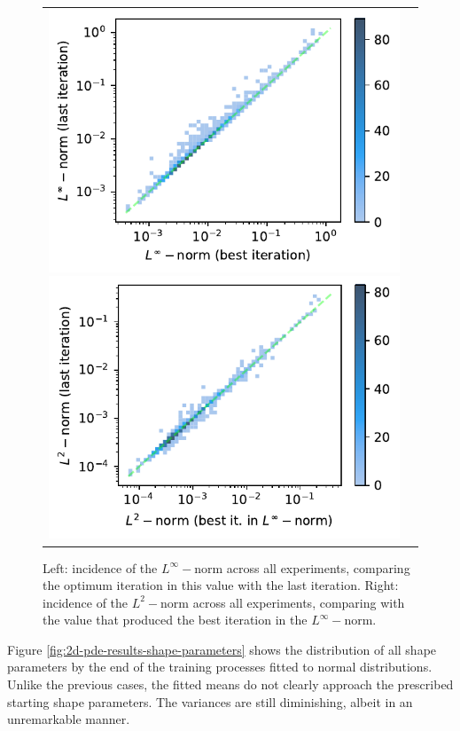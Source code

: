 \documentclass[12pt]{report} %
\begin{document}
\begin{figure}[h]
  \hspace*{-2cm}
  \begin{tabular}{cc}
    \includegraphics[width=.6\textwidth]{imagenes/experiments/2d/pde_parabola/incidence_of_linf.pdf}
    \includegraphics[width=.6\textwidth]{imagenes/experiments/2d/pde_parabola/incidence_of_l2.pdf}
  \end{tabular}
  \caption{Left: incidence of the $L^\infty-$norm across all experiments, comparing the optimum iteration in this value with the last iteration. Right: incidence of the $L^2-$norm across all experiments, comparing with the value that produced the best iteration in the $L^\infty-$norm.}
  \label{fig:pde-2d-results-incidence-l-norms}
\end{figure}

Figure \ref{fig:2d-pde-results-shape-parameters} shows the distribution of all shape parameters by the end of the training processes fitted to normal distributions. Unlike the previous cases, the fitted means do not clearly approach the prescribed starting shape parameters. The variances are still diminishing, albeit in an unremarkable manner.
\end{document}
